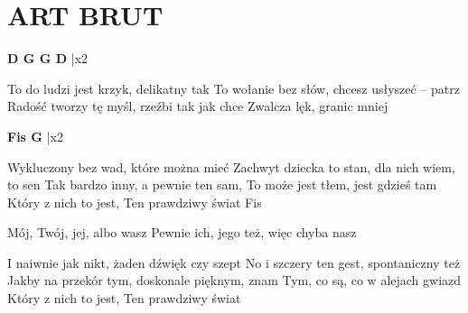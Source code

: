\documentclass[../../../songbook.tex]{subfiles}
\begin{document}
\TabPositions{7cm} %
\section*{ART BRUT}
{}
\vspace{0.5cm}
	  
{\color{red}\textbf{D G G D} } |x2 \newline

To do ludzi jest krzyk, delikatny tak		   \newline
To wołanie bez słów, chcesz usłyszeć – patrz   \newline
Radość tworzy tę myśl, rzeźbi tak jak chce	   \newline
Zwalcza lęk, granic mniej			  		   \newline

{\color{red}\textbf{Fis G} } |x2 \newline

Wykluczony bez wad, które można mieć			\newline
Zachwyt dziecka to stan, dla nich wiem, to sen	\newline
Tak bardzo inny, a pewnie ten sam,				\newline
To może jest tłem, jest gdzieś tam				\newline
Który z nich to jest,		 \newline
Ten prawdziwy świat	Fis   	 \newline

\-\hspace{1cm} Mój, Twój, jej, albo wasz		 \newline
\-\hspace{1cm} Pewnie ich, jego też, więc chyba nasz	 \newline

I naiwnie jak nikt, żaden dźwięk czy szept		\newline
No i szczery ten gest, spontaniczny też			\newline
Jakby na przekór tym, doskonale pięknym, znam	\newline
Tym, co są, co w alejach gwiazd					\newline
Który z nich to jest,		\newline
Ten prawdziwy świat			\newline
\end{document}
